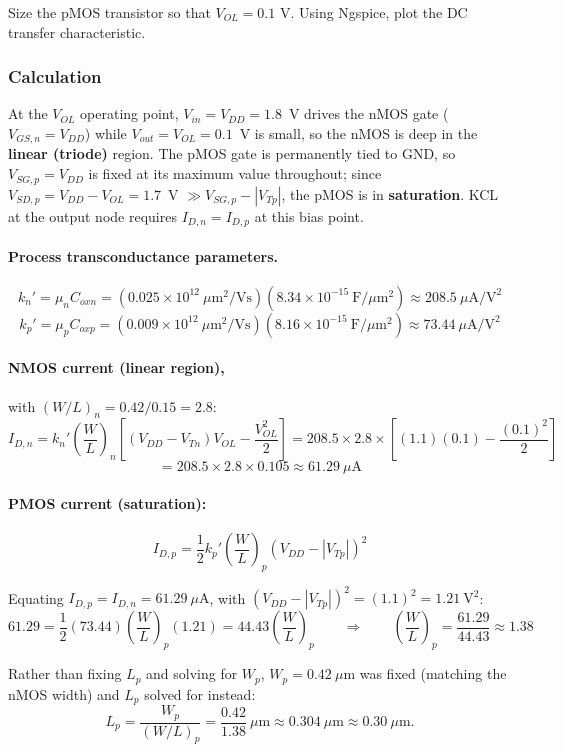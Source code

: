 Size the pMOS transistor so that $V_{OL} = 0.1$ V. Using Ngspice, plot the DC
transfer characteristic.

\subsubsection{Calculation}

At the $V_{OL}$ operating point, $V_{in}=V_{DD}=1.8$~V drives the nMOS gate
($V_{GS,n}=V_{DD}$) while $V_{out}=V_{OL}=0.1$~V is small, so the nMOS is deep
in the \textbf{linear (triode)} region. The pMOS gate is permanently tied to
GND, so $V_{SG,p}=V_{DD}$ is fixed at its maximum value throughout; since
$V_{SD,p}=V_{DD}-V_{OL}=1.7$~V $\gg V_{SG,p}-|V_{Tp}|$, the pMOS is in
\textbf{saturation}. KCL at the output node requires $I_{D,n}=I_{D,p}$ at this
bias point.

\paragraph{Process transconductance parameters.}
\[
k_n' = \mu_n C_{oxn} =
(0.025\times10^{12}\ \mu\text{m}^2/\text{Vs})(8.34\times10^{-15}\ \text{F}/\mu\text{m}^2)
\approx 208.5\ \mu\text{A}/\text{V}^2
\]
\[
k_p' = \mu_p C_{oxp} =
(0.009\times10^{12}\ \mu\text{m}^2/\text{Vs})(8.16\times10^{-15}\ \text{F}/\mu\text{m}^2)
\approx 73.44\ \mu\text{A}/\text{V}^2
\]

\paragraph{NMOS current (linear region),} with $(W/L)_n = 0.42/0.15 = 2.8$:
\[
I_{D,n} = k_n'\left(\frac{W}{L}\right)_n\left[(V_{DD}-V_{Tn})V_{OL} -
\frac{V_{OL}^2}{2}\right]
= 208.5\times2.8\times\left[(1.1)(0.1)-\frac{(0.1)^2}{2}\right]
\]
\[
= 208.5\times2.8\times0.105 \approx 61.29\ \mu\text{A}
\]

\paragraph{PMOS current (saturation):}
\[
I_{D,p} = \frac{1}{2}k_p'\left(\frac{W}{L}\right)_p(V_{DD}-|V_{Tp}|)^2
\]

Equating $I_{D,p}=I_{D,n}=61.29\ \mu\text{A}$, with $(V_{DD}-|V_{Tp}|)^2 =
(1.1)^2 = 1.21\ \text{V}^2$:
\[
61.29 = \frac{1}{2}(73.44)\left(\frac{W}{L}\right)_p(1.21) =
44.43\left(\frac{W}{L}\right)_p
\qquad\Rightarrow\qquad
\left(\frac{W}{L}\right)_p = \frac{61.29}{44.43} \approx 1.38
\]

Rather than fixing $L_p$ and solving for $W_p$, $W_p = 0.42\ \mu\text{m}$ was
fixed (matching the nMOS width) and $L_p$ solved for instead:
\[
L_p = \frac{W_p}{(W/L)_p} = \frac{0.42}{1.38}\ \mu\text{m} \approx
0.304\ \mu\text{m} \approx 0.30\ \mu\text{m}.
\]

